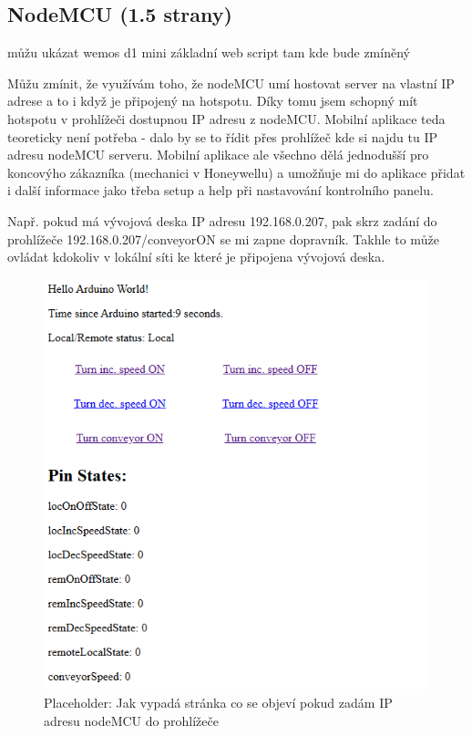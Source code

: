 \subsection{NodeMCU (1.5 strany)}\label{sec:NodeMCU}

můžu ukázat wemos d1 mini základní web script tam kde bude zmíněný \cite{NavodNaESPWebServerDratek}

Můžu zmínit, že využívám toho, že nodeMCU umí hostovat server na vlastní IP adrese a to i když je připojený na hotspotu. Díky tomu jsem schopný mít hotspotu v prohlížeči dostupnou IP adresu z nodeMCU. Mobilní aplikace teda teoreticky není potřeba - dalo by se to řídit přes prohlížeč kde si najdu tu IP adresu nodeMCU serveru. Mobilní aplikace ale všechno dělá jednodušší pro koncovýho zákazníka (mechanici v Honeywellu) a umožňuje mi do aplikace přidat i další informace jako třeba setup a help při nastavování kontrolního panelu.

Např. pokud má vývojová deska IP adresu 192.168.0.207, pak skrz zadání do prohlížeče 192.168.0.207/conveyorON se mi zapne dopravník. Takhle to může ovládat kdokoliv v lokální síti ke které je připojena vývojová deska.

\begin{figure}[H]
    \centering
    \includegraphics[width=0.8\linewidth]{images/nodeMCUlandingPage.png}
    \caption{Placeholder: Jak vypadá stránka co se objeví pokud zadám IP adresu nodeMCU do prohlížeče}
    \label{fig:NodeMCUlandingPage}
\end{figure}




